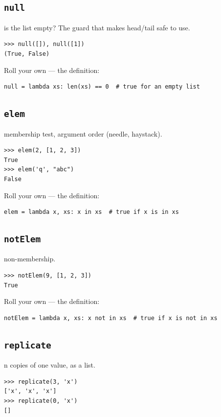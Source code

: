 \documentclass[10pt,letterpaper]{book}
\begin{document}
\subsection{\texttt{null}}\label{def:null}
is the list empty? The guard that makes head/tail safe to use.
\begin{lstlisting}[style=ex]
>>> null([]), null([1])
(True, False)
\end{lstlisting}

Roll your own --- the definition:

\begin{lstlisting}[style=ex]
null = lambda xs: len(xs) == 0  # true for an empty list
\end{lstlisting}
\subsection{\texttt{elem}}\label{def:elem}
membership test, argument order (needle, haystack).
\begin{lstlisting}[style=ex]
>>> elem(2, [1, 2, 3])
True
>>> elem('q', "abc")
False
\end{lstlisting}

Roll your own --- the definition:

\begin{lstlisting}[style=ex]
elem = lambda x, xs: x in xs  # true if x is in xs
\end{lstlisting}
\subsection{\texttt{notElem}}\label{def:notElem}
non-membership.
\begin{lstlisting}[style=ex]
>>> notElem(9, [1, 2, 3])
True
\end{lstlisting}

Roll your own --- the definition:

\begin{lstlisting}[style=ex]
notElem = lambda x, xs: x not in xs  # true if x is not in xs
\end{lstlisting}
\subsection{\texttt{replicate}}\label{def:replicate}
n copies of one value, as a list.
\begin{lstlisting}[style=ex]
>>> replicate(3, 'x')
['x', 'x', 'x']
>>> replicate(0, 'x')
[]
\end{lstlisting}
\end{document}
